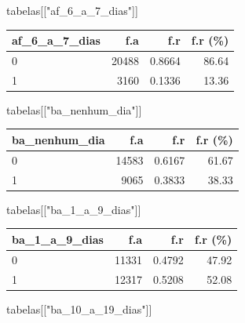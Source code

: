 \documentclass[
]{article}
\newenvironment{Shaded}{\begin{snugshade}}{\end{snugshade}}
\newcommand{\NormalTok}[1]{\textcolor[rgb]{0.00,0.23,0.31}{#1}}
\newcommand{\StringTok}[1]{\textcolor[rgb]{0.13,0.47,0.30}{#1}}
\begin{document}
\begin{Shaded}
\begin{Highlighting}[]
\NormalTok{tabelas[[}\StringTok{"af\_6\_a\_7\_dias"}\NormalTok{]]}
\end{Highlighting}
\end{Shaded}

\begin{longtable}[]{@{}lrrr@{}}
\toprule()
af\_6\_a\_7\_dias & f.a & f.r & f.r (\%) \\
\midrule()
\endhead
0 & 20488 & 0.8664 & 86.64 \\
1 & 3160 & 0.1336 & 13.36 \\
\bottomrule()
\end{longtable}

\begin{Shaded}
\begin{Highlighting}[]
\NormalTok{tabelas[[}\StringTok{"ba\_nenhum\_dia"}\NormalTok{]]}
\end{Highlighting}
\end{Shaded}

\begin{longtable}[]{@{}lrrr@{}}
\toprule()
ba\_nenhum\_dia & f.a & f.r & f.r (\%) \\
\midrule()
\endhead
0 & 14583 & 0.6167 & 61.67 \\
1 & 9065 & 0.3833 & 38.33 \\
\bottomrule()
\end{longtable}

\begin{Shaded}
\begin{Highlighting}[]
\NormalTok{tabelas[[}\StringTok{"ba\_1\_a\_9\_dias"}\NormalTok{]]}
\end{Highlighting}
\end{Shaded}

\begin{longtable}[]{@{}lrrr@{}}
\toprule()
ba\_1\_a\_9\_dias & f.a & f.r & f.r (\%) \\
\midrule()
\endhead
0 & 11331 & 0.4792 & 47.92 \\
1 & 12317 & 0.5208 & 52.08 \\
\bottomrule()
\end{longtable}

\begin{Shaded}
\begin{Highlighting}[]
\NormalTok{tabelas[[}\StringTok{"ba\_10\_a\_19\_dias"}\NormalTok{]]}
\end{Highlighting}
\end{Shaded}
\end{document}
